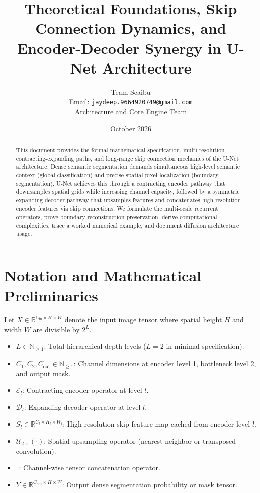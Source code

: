 \documentclass[11pt,a4paper]{article}
\title{\textbf{Theoretical Foundations, Skip Connection Dynamics, and Encoder-Decoder Synergy in U-Net Architecture}}
\author{Team Scaibu \\ \small Email: \texttt{jaydeep.9664920749@gmail.com} \\ \small Architecture and Core Engine Team}
\date{October 2026}
\theoremstyle{definition}
\begin{document}
\maketitle

\begin{abstract}
This document provides the formal mathematical specification, multi-resolution contracting-expanding paths, and long-range skip connection mechanics of the U-Net architecture. Dense semantic segmentation demands simultaneous high-level semantic context (global classification) and precise spatial pixel localization (boundary segmentation). U-Net achieves this through a contracting encoder pathway that downsamples spatial grids while increasing channel capacity, followed by a symmetric expanding decoder pathway that upsamples features and concatenates high-resolution encoder features via skip connections. We formulate the multi-scale recurrent operators, prove boundary reconstruction preservation, derive computational complexities, trace a worked numerical example, and document diffusion architecture usage.
\end{abstract}

\section{Notation and Mathematical Preliminaries}

Let $X \in \mathbb{R}^{C_{\text{in}} \times H \times W}$ denote the input image tensor where spatial height $H$ and width $W$ are divisible by $2^L$.

\begin{itemize}
    \item $L \in \mathbb{N}_{\ge 1}$: Total hierarchical depth levels ($L = 2$ in minimal specification).
    \item $C_1, C_2, C_{\text{out}} \in \mathbb{N}_{\ge 1}$: Channel dimensions at encoder level 1, bottleneck level 2, and output mask.
    \item $\mathcal{E}_l$: Contracting encoder operator at level $l$.
    \item $\mathcal{D}_l$: Expanding decoder operator at level $l$.
    \item $S_l \in \mathbb{R}^{C_l \times H_l \times W_l}$: High-resolution skip feature map cached from encoder level $l$.
    \item $\mathcal{U}_{2\times}(\cdot)$: Spatial upsampling operator (nearest-neighbor or transposed convolution).
    \item $\mathbin{\Vert}$: Channel-wise tensor concatenation operator.
    \item $Y \in \mathbb{R}^{C_{\text{out}} \times H \times W}$: Output dense segmentation probability or mask tensor.
\end{itemize}
\end{document}
